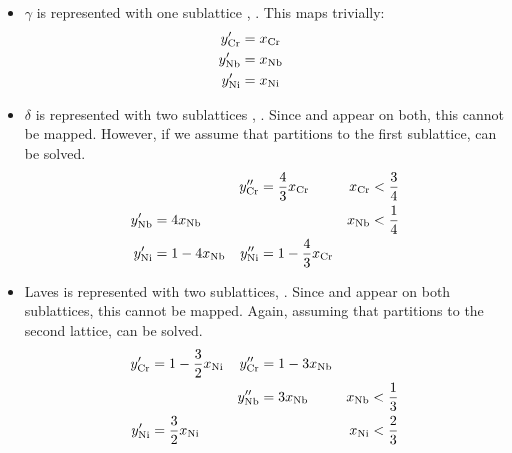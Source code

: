 \documentclass[10pt]{article}
\begin{document}
		\begin{itemize}
		\item $\gamma$ is represented with one sublattice \cite{Du2005}, .
			This maps trivially:
			\begin{align*}
				y_{\ce{Cr}}' &= x_{\ce{Cr}} & & & &\\
				y_{\ce{Nb}}' &= x_{\ce{Nb}} & & & &\\
				y_{\ce{Ni}}' &= x_{\ce{Ni}} & & & &
			\end{align*}
		
		\item $\delta$ is represented with two sublattices \cite{Du2005}, .
			Since  and  appear on both, this cannot be mapped.
			However, if we assume that  partitions to the first sublattice,
			 can be solved.
			\begin{align*}
				             &                   & y_{\ce{Cr}}'' &= \frac{4}{3}x_{\ce{Cr}}     & x_{\ce{Cr}}&<\frac{3}{4}\\
				y_{\ce{Nb}}' &= 4x_{\ce{Nb}}     &               &                             & x_{\ce{Nb}}&<\frac{1}{4}\\
				y_{\ce{Ni}}' &= 1 - 4x_{\ce{Nb}} & y_{\ce{Ni}}'' &= 1 - \frac{4}{3}x_{\ce{Cr}} &            &\\
			\end{align*}
		
		\item Laves is represented with two sublattices, .
			Since  and  appear on both sublattices, this cannot be mapped.
			Again, assuming that  partitions to the second lattice,
			 can be solved.
			\begin{align*}
				y_{\ce{Cr}}' &= 1 - \frac{3}{2}x_{\ce{Ni}} & y_{\ce{Cr}}'' &= 1 - 3x_{\ce{Nb}} &             &\\
				             &                             & y_{\ce{Nb}}'' &= 3x_{\ce{Nb}}     & x_{\ce{Nb}} &< \frac{1}{3}\\
				y_{\ce{Ni}}' &= \frac{3}{2}x_{\ce{Ni}}     &               &                   & x_{\ce{Ni}} &< \frac{2}{3}\\
			\end{align*}
		\end{itemize}		
\end{document}
